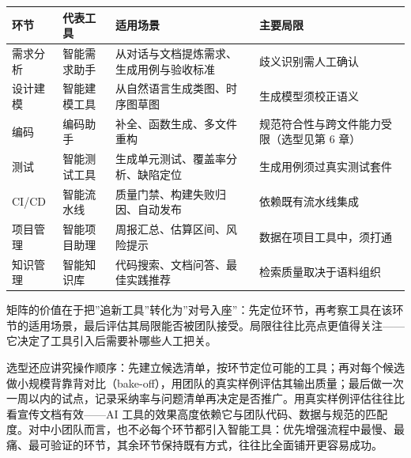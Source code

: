 \documentclass[12pt,a4paper,twoside,openany]{ctexbook}
\numberwithin{figure}{chapter}
\numberwithin{table}{chapter}
\newcounter{none}
\begin{document}
{\def\LTcaptype{none} %
\begin{longtable}[]{@{}
  >{\raggedright\arraybackslash}p{}
  >{\raggedright\arraybackslash}p{}
  >{\raggedright\arraybackslash}p{}
  >{\raggedright\arraybackslash}p{}@{}}
\toprule\noalign{}
\begin{minipage}[b]{\linewidth}\raggedright
环节
\end{minipage} & \begin{minipage}[b]{\linewidth}\raggedright
代表工具
\end{minipage} & \begin{minipage}[b]{\linewidth}\raggedright
适用场景
\end{minipage} & \begin{minipage}[b]{\linewidth}\raggedright
主要局限
\end{minipage} \\
\midrule\noalign{}
\endhead
\bottomrule\noalign{}
\endlastfoot
需求分析 & 智能需求助手 & 从对话与文档提炼需求、生成用例与验收标准 &
歧义识别需人工确认 \\
设计建模 & 智能建模工具 & 从自然语言生成类图、时序图草图 &
生成模型须校正语义 \\
编码 & 编码助手 & 补全、函数生成、多文件重构 &
规范符合性与跨文件能力受限（选型见第 6 章） \\
测试 & 智能测试工具 & 生成单元测试、覆盖率分析、缺陷定位 &
生成用例须过真实测试套件 \\
CI/CD & 智能流水线 & 质量门禁、构建失败归因、自动发布 &
依赖既有流水线集成 \\
项目管理 & 智能项目助理 & 周报汇总、估算区间、风险提示 &
数据在项目工具中，须打通 \\
知识管理 & 智能知识库 & 代码搜索、文档问答、最佳实践推荐 &
检索质量取决于语料组织 \\
\end{longtable}
}

矩阵的价值在于把''追新工具''转化为''对号入座''：先定位环节，再考察工具在该环节的适用场景，最后评估其局限能否被团队接受。局限往往比亮点更值得关注------它决定了工具引入后需要补哪些人工把关。

选型还应讲究操作顺序：先建立候选清单，按环节定位可能的工具；再对每个候选做小规模背靠背对比（bake-off），用团队的真实样例评估其输出质量；最后做一次一周以内的试点，记录采纳率与问题清单再决定是否推广。用真实样例评估往往比看宣传文档有效------AI
工具的效果高度依赖它与团队代码、数据与规范的匹配度。对中小团队而言，也不必每个环节都引入智能工具：优先增强流程中最慢、最痛、最可验证的环节，其余环节保持既有方式，往往比全面铺开更容易成功。
\end{document}

